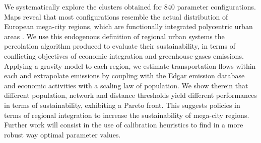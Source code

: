 \documentclass[12pt]{article}
\begin{document}
We systematically explore the clusters obtained for 840 parameter configurations. Maps reveal that most configurations resemble the actual distribution of European mega-city regions, which are functionally integrated polycentric urban areas \citep{hall2006polycentric}. We use this endogenous definition of regional urban systems the percolation algorithm produced to evaluate their sustainability, in terms of conflicting objectives of economic integration and greenhouse gases emissions. Applying a gravity model to each region, we estimate transportation flows within each and extrapolate emissions by coupling with the Edgar emission database \citep{janssens2017edgar} and economic activities with a scaling law of population. We show therein that different population, network and distance thresholds yield different performances in terms of sustainability, exhibiting a Pareto front. This suggests policies in terms of regional integration to increase the sustainability of mega-city regions. Further work will consist in the use of calibration heuristics \citep{reuillon2013openmole} to find in a more robust way optimal parameter values.











\end{document}

